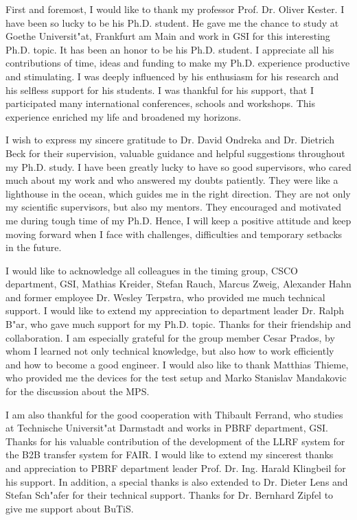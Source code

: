 First and foremost, I would like to thank my professor Prof. Dr. Oliver Kester. I have been so lucky to be his Ph.D. student. He gave me the chance to study at Goethe Universit"at, Frankfurt am Main and work in GSI for this interesting Ph.D. topic. It has been an honor to be his Ph.D. student. I appreciate all his contributions of time, ideas and funding to make my Ph.D. experience productive and stimulating. I was deeply influenced by his enthusiasm for his research and his selfless support for his students. I was thankful for his support, that I participated many international conferences, schools and workshops. This experience enriched my life and  
broadened my horizons.

I wish to express my sincere gratitude to Dr. David Ondreka and Dr. Dietrich Beck for their supervision, valuable guidance and helpful suggestions throughout my Ph.D. study. I have been greatly lucky to have so good supervisors, who cared much about my work and who answered my doubts patiently. They were like a lighthouse in the ocean, which guides me in the right direction. They are not only my  scientific supervisors, but also my mentors. They encouraged and motivated me during tough time of my Ph.D. Hence, I will keep a positive attitude and keep moving forward when I face with challenges, difficulties and temporary setbacks in the future.

I would like to acknowledge all colleagues in the timing group, \gls{CSCO} department, GSI, Mathias Kreider, Stefan Rauch, Marcus Zweig, Alexander Hahn and former employee Dr. Wesley Terpstra, who provided me much technical support. I would like to extend my appreciation to department leader Dr. Ralph B"ar, who gave much support for my Ph.D. topic. Thanks for their friendship and collaboration. I am especially grateful for the group member Cesar Prados, by whom I learned not only technical knowledge, but also how to work efficiently and how to become a good engineer. I would also like to thank Matthias Thieme, who provided me the devices for the test setup and Marko Stanislav Mandakovic for the discussion about the MPS.

I am also thankful for the good cooperation with Thibault Ferrand, who studies at Technische Universit"at Darmstadt and works in \gls{PBRF} department, GSI. Thanks for his valuable contribution of the development of the LLRF system for the B2B transfer system for FAIR. I would like to extend my sincerest thanks and appreciation to PBRF department leader Prof. Dr. Ing. Harald Klingbeil for his support. In addition, a special thanks is also extended to Dr. Dieter Lens and Stefan Sch"afer for their technical support. Thanks for Dr. Bernhard Zipfel to give me support about BuTiS.

